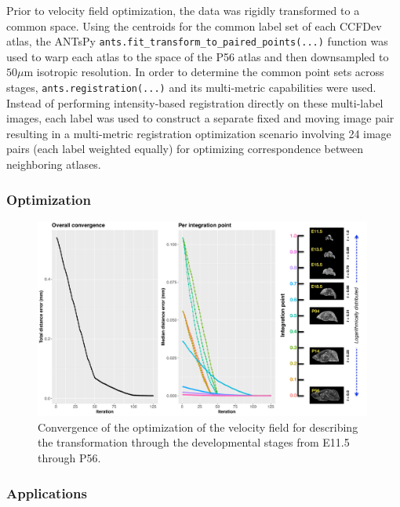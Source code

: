 \documentclass[
  12pt,
]{article}
\begin{document}
Prior to velocity field optimization, the data was rigidly transformed
to a common space. Using the centroids for the common label set of each
CCFDev atlas, the ANTsPy
\texttt{ants.fit\_transform\_to\_paired\_points(...)} function was used
to warp each atlas to the space of the P56 atlas and then downsampled to
\(50 \mu\)m isotropic resolution. In order to determine the common point
sets across stages, \texttt{ants.registration(...)} and its multi-metric
capabilities were used. Instead of performing intensity-based
registration directly on these multi-label images, each label was used
to construct a separate fixed and moving image pair resulting in a
multi-metric registration optimization scenario involving 24 image pairs
(each label weighted equally) for optimizing correspondence between
neighboring atlases.

\hypertarget{optimization}{%
\subsubsection*{Optimization}\label{optimization}}

\begin{figure}[!htb]
\centering
\includegraphics[width=0.99\textwidth]{Figures/convergence.pdf}
\caption{Convergence of the optimization of the velocity field for describing the 
transformation through the developmental stages from E11.5 through P56.}
\label{fig:convergence}
\end{figure}

\hypertarget{applications}{%
\subsubsection*{Applications}\label{applications}}
\end{document}
